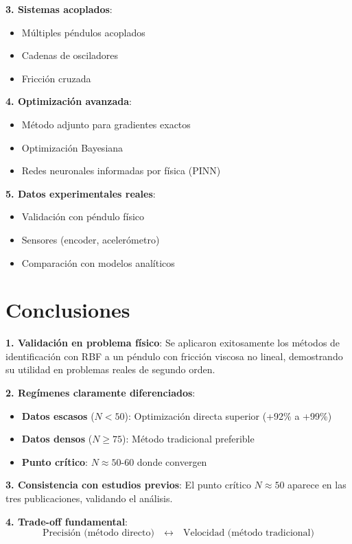 \documentclass[11pt,a4paper]{article}
\begin{document}
\textbf{3. Sistemas acoplados}:
\begin{itemize}
\item Múltiples péndulos acoplados
\item Cadenas de osciladores
\item Fricción cruzada
\end{itemize}

\textbf{4. Optimización avanzada}:
\begin{itemize}
\item Método adjunto para gradientes exactos
\item Optimización Bayesiana
\item Redes neuronales informadas por física (PINN)
\end{itemize}

\textbf{5. Datos experimentales reales}:
\begin{itemize}
\item Validación con péndulo físico
\item Sensores (encoder, acelerómetro)
\item Comparación con modelos analíticos
\end{itemize}

\section{Conclusiones}

\textbf{1. Validación en problema físico}: Se aplicaron exitosamente los métodos de identificación con RBF a un péndulo con fricción viscosa no lineal, demostrando su utilidad en problemas reales de segundo orden.

\textbf{2. Regímenes claramente diferenciados}:
\begin{itemize}
\item \textbf{Datos escasos} ($N < 50$): Optimización directa superior (+92\% a +99\%)
\item \textbf{Datos densos} ($N \geq 75$): Método tradicional preferible
\item \textbf{Punto crítico}: $N \approx 50$-$60$ donde convergen
\end{itemize}

\textbf{3. Consistencia con estudios previos}: El punto crítico $N \approx 50$ aparece en las tres publicaciones, validando el análisis.

\textbf{4. Trade-off fundamental}:
\begin{equation*}
\text{Precisión (método directo)} \quad \longleftrightarrow \quad \text{Velocidad (método tradicional)}
\end{equation*}
\end{document}
